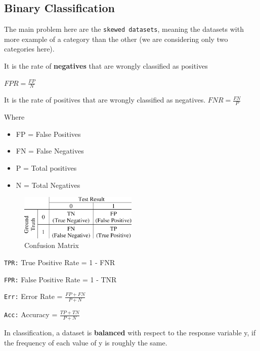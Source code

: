 \subsection{Binary Classification}

The main problem here are the \texttt{skewed datasets}, meaning the datasets with more example of a category than the other (we are considering only two categories here).

\begin{definitionblock}
    It is the rate of \textbf{negatives} that are wrongly classified as positives

    $FPR = \frac{FP}{N}$
\end{definitionblock}
\begin{definitionblock}
    It is the rate of positives that are wrongly classified as negatives.
    $FNR = \frac{FN}{P}$
\end{definitionblock}
Where
\begin{itemize}
    \item FP = False Positives 
    \item FN = False Negatives 
    \item P = Total positives 
    \item N = Total Negatives 
\end{itemize}

\begin{center}
    \begin{figure}[H]
        \centering
        \includegraphics[width=0.5\textwidth]{assets/fig5.png}
        \caption{Confusion Matrix}
    \end{figure}
\end{center}

\texttt{TPR:} True Positive Rate = 1 - FNR

\texttt{FPR:} False Positive Rate = 1 - TNR

\texttt{Err:} Error Rate = $\frac{FP + FN}{P + N}$

\texttt{Acc:} Accuracy = $\frac{TP + TN}{P + N}$

\begin{definitionblock}
    In classification, a dataset is \textbf{balanced} with respect to the response variable y, if the frequency of each value of y is roughly the same.
\end{definitionblock}

